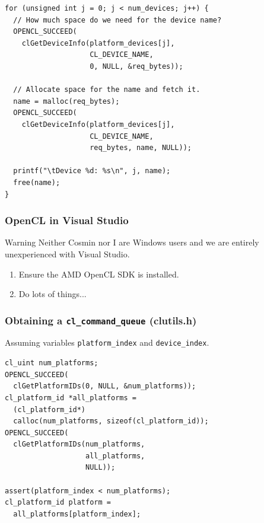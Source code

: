 \documentclass{beamer}
\begin{document}
\begin{frame}[fragile]
\begin{lstlisting}
for (unsigned int j = 0; j < num_devices; j++) {
  // How much space do we need for the device name?
  OPENCL_SUCCEED(
    clGetDeviceInfo(platform_devices[j],
                    CL_DEVICE_NAME,
                    0, NULL, &req_bytes));

  // Allocate space for the name and fetch it.
  name = malloc(req_bytes);
  OPENCL_SUCCEED(
    clGetDeviceInfo(platform_devices[j],
                    CL_DEVICE_NAME,
                    req_bytes, name, NULL));

  printf("\tDevice %d: %s\n", j, name);
  free(name);
}
\end{lstlisting}
\end{frame}

\begin{frame}
  \frametitle{OpenCL in Visual Studio}

  \begin{block}{Warning}
    Neither Cosmin nor I are Windows users and we are entirely
    unexperienced with Visual Studio.
  \end{block}

  \begin{enumerate}
  \item Ensure the AMD OpenCL SDK is installed.
  \item Do lots of things...
  \end{enumerate}

\end{frame}

\begin{frame}[fragile]
  \frametitle{Obtaining a \texttt{cl\_command\_queue} (clutils.h)}

Assuming variables \texttt{platform\_index} and \texttt{device\_index}.

\begin{lstlisting}
cl_uint num_platforms;
OPENCL_SUCCEED(
  clGetPlatformIDs(0, NULL, &num_platforms));
cl_platform_id *all_platforms =
  (cl_platform_id*)
  calloc(num_platforms, sizeof(cl_platform_id));
OPENCL_SUCCEED(
  clGetPlatformIDs(num_platforms,
                   all_platforms,
                   NULL));

assert(platform_index < num_platforms);
cl_platform_id platform =
  all_platforms[platform_index];
\end{lstlisting}

\end{frame}
\end{document}
